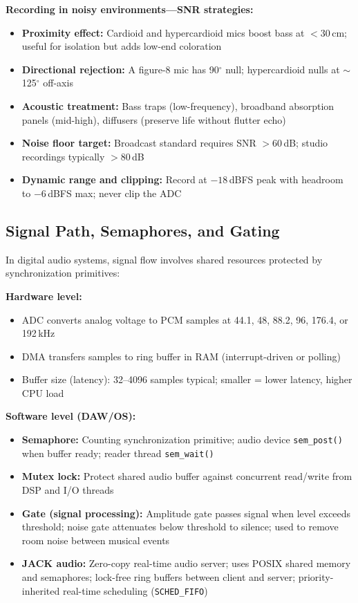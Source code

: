 \documentclass[11pt,letterpaper]{article}
\begin{document}
\textbf{Recording in noisy environments---SNR strategies:}
\begin{itemize}[noitemsep]
  \item \textbf{Proximity effect:} Cardioid and hypercardioid mics boost bass at $<$30\,cm; useful for isolation but adds low-end coloration
  \item \textbf{Directional rejection:} A figure-8 mic has 90$^\circ$ null; hypercardioid nulls at $\sim$125$^\circ$ off-axis
  \item \textbf{Acoustic treatment:} Bass traps (low-frequency), broadband absorption panels (mid-high), diffusers (preserve life without flutter echo)
  \item \textbf{Noise floor target:} Broadcast standard requires SNR $>$60\,dB; studio recordings typically $>$80\,dB
  \item \textbf{Dynamic range and clipping:} Record at $-18$\,dBFS peak with headroom to $-6$\,dBFS max; never clip the ADC
\end{itemize}

\subsection{Signal Path, Semaphores, and Gating}

In digital audio systems, signal flow involves shared resources protected by synchronization primitives:

\textbf{Hardware level:}
\begin{itemize}[noitemsep]
  \item ADC converts analog voltage to PCM samples at 44.1, 48, 88.2, 96, 176.4, or 192\,kHz
  \item DMA transfers samples to ring buffer in RAM (interrupt-driven or polling)
  \item Buffer size (latency): 32--4096 samples typical; smaller = lower latency, higher CPU load
\end{itemize}

\textbf{Software level (DAW/OS):}
\begin{itemize}[noitemsep]
  \item \textbf{Semaphore:} Counting synchronization primitive; audio device \texttt{sem\_post()} when buffer ready; reader thread \texttt{sem\_wait()}
  \item \textbf{Mutex lock:} Protect shared audio buffer against concurrent read/write from DSP and I/O threads
  \item \textbf{Gate (signal processing):} Amplitude gate passes signal when level exceeds threshold; noise gate attenuates below threshold to silence; used to remove room noise between musical events
  \item \textbf{JACK audio:} Zero-copy real-time audio server; uses POSIX shared memory and semaphores; lock-free ring buffers between client and server; priority-inherited real-time scheduling (\texttt{SCHED\_FIFO})
\end{itemize}
\end{document}
